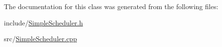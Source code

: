 The documentation for this class was generated from the following files\+:\begin{DoxyCompactItemize}
\item 
include/\hyperlink{_simple_scheduler_8h}{Simple\+Scheduler.\+h}\item 
src/\hyperlink{_simple_scheduler_8cpp}{Simple\+Scheduler.\+cpp}\end{DoxyCompactItemize}
